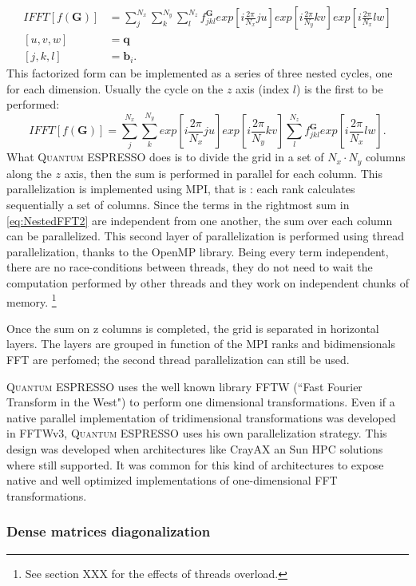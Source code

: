 \documentclass[a4paper,12pt]{article}
\newcommand\mf[1]{\mathbf{#1}}
\newcommand\GI{\mathbf{G}}
\newcommand\QE{\textsc{Quantum} ESPRESSO }
\begin{document}
\begin{align}
	IFFT[f(\GI)] &= \sum_{j}^{N_x} \sum_{k}^{N_y} \sum_{l}^{N_z} f^{\GI}_{jkl}
		exp \left[i \frac{2\pi}{N_x}ju \right] 
		exp \left[i \frac{2\pi}{N_y}kv \right] 
		exp \left[i \frac{2\pi}{N_x}lw \right] \\
		[u,v,w] &= \mf{q} \\
		[j,k,l] &= \mf{b}_i.
\end{align}
This factorized form can be implemented as a series of three nested cycles, one for each dimension.
Usually the cycle on the $z$ axis (index $l$) is the first to be performed:
\begin{equation}\label{eq:NestedFFT2}
	IFFT[f(\GI)] = \sum_{j}^{N_x} \sum_{k}^{N_y} 
		exp \left[i \frac{2\pi}{N_x}ju \right] 
		exp \left[i \frac{2\pi}{N_y}kv \right] 
		\sum_{l}^{N_z} 	f^{\GI}_{jkl} exp \left[i \frac{2\pi}{N_x}lw \right].
\end{equation}
What \QE does is to divide the grid in a set of $N_x \cdot N_y$ columns along the $z$ axis, then the sum is performed in parallel for each column. 
This parallelization is implemented using MPI, that is : each rank calculates sequentially a set of columns.
Since the terms in the rightmost sum in \eqref{eq:NestedFFT2} are independent from one another, the sum over each column can be parallelized. 
This second layer of parallelization is performed using thread parallelization, thanks to the OpenMP library.
Being every term independent, there are no race-conditions between threads, they do not need to wait the computation performed by other threads and they work on independent chunks of memory. \footnote{See section XXX for the effects of threads overload.}

Once the sum on z columns is completed, the grid is separated in horizontal layers. 
The layers are grouped in function of the MPI ranks and bidimensionals FFT are perfomed; the second thread parallelization can still be used.

\QE uses the well known library FFTW (``Fast Fourier Transform in the West")\cite{FFTW} to perform one dimensional transformations. 
Even if a native parallel implementation of tridimensional transformations was developed in FFTWv3, \QE uses his own parallelization strategy. 
This design was developed when architectures like CrayAX an Sun HPC solutions where still supported. It was common for this kind of architectures to expose native and well optimized implementations of one-dimensional FFT transformations.

\subsubsection{Dense matrices diagonalization}
\end{document}
